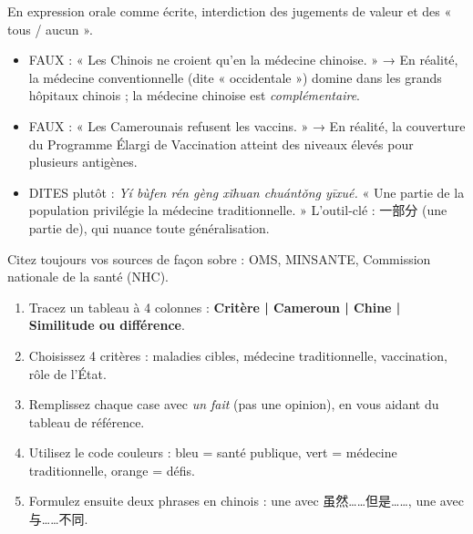 \documentclass[11pt]{article}
\newcommand{\cle}[1]{{\popxbold\color{popdark}#1}}
\newcommand{\zh}[1]{\ifmmode\text{#1}\else{#1}\fi}
\begin{document}
\begin{attention}
En expression orale comme écrite, interdiction des jugements de valeur et des « tous / aucun ».
\begin{itemize}
\item FAUX : « Les Chinois ne croient qu'en la médecine chinoise. » → En réalité, la médecine conventionnelle (dite « occidentale ») domine dans les grands hôpitaux chinois ; la médecine chinoise est \emph{complémentaire}.
\item FAUX : « Les Camerounais refusent les vaccins. » → En réalité, la couverture du Programme Élargi de Vaccination atteint des niveaux élevés pour plusieurs antigènes.
\item DITES plutôt : \zh{一部分人更喜欢传统医学。} \emph{Yí bùfen rén gèng xǐhuan chuántǒng yīxué.} « Une partie de la population privilégie la médecine traditionnelle. » L'outil-clé : \cle{一部分} (une partie de), qui nuance toute généralisation.
\end{itemize}
Citez toujours vos sources de façon sobre : OMS, MINSANTE, Commission nationale de la santé (NHC).
\end{attention}

\begin{methode}
\begin{enumerate}
\item Tracez un tableau à 4 colonnes : \textbf{Critère | Cameroun | Chine | Similitude ou différence}.
\item Choisissez 4 critères : maladies cibles, médecine traditionnelle, vaccination, rôle de l'État.
\item Remplissez chaque case avec \emph{un fait} (pas une opinion), en vous aidant du tableau de référence.
\item Utilisez le code couleurs : \textcolor{popblue}{bleu} = santé publique, \textcolor{popgreen}{vert} = médecine traditionnelle, \textcolor{poporange}{orange} = défis.
\item Formulez ensuite deux phrases en chinois : une avec 虽然……但是……, une avec 与……不同.
\end{enumerate}
\end{methode}
\end{document}
